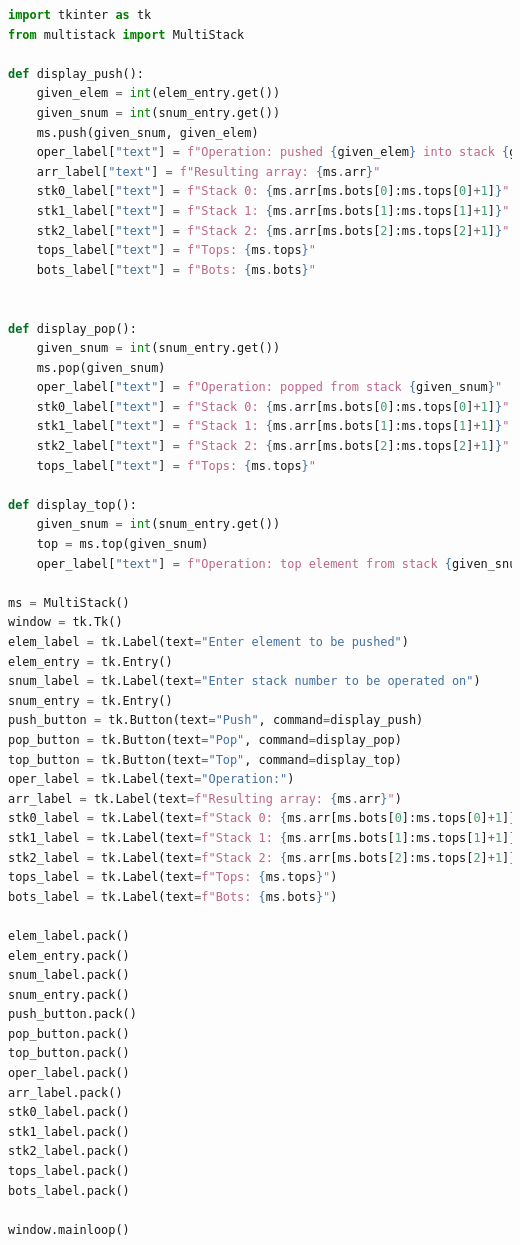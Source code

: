 \documentclass[12pt]{report}
\begin{document}
\begin{lstlisting}[language=Python, caption=multistack\_gui.py]
import tkinter as tk
from multistack import MultiStack

def display_push():
    given_elem = int(elem_entry.get())
    given_snum = int(snum_entry.get())
    ms.push(given_snum, given_elem)
    oper_label["text"] = f"Operation: pushed {given_elem} into stack {given_snum}"
    arr_label["text"] = f"Resulting array: {ms.arr}"
    stk0_label["text"] = f"Stack 0: {ms.arr[ms.bots[0]:ms.tops[0]+1]}"
    stk1_label["text"] = f"Stack 1: {ms.arr[ms.bots[1]:ms.tops[1]+1]}"
    stk2_label["text"] = f"Stack 2: {ms.arr[ms.bots[2]:ms.tops[2]+1]}"
    tops_label["text"] = f"Tops: {ms.tops}"
    bots_label["text"] = f"Bots: {ms.bots}"


def display_pop():
    given_snum = int(snum_entry.get())
    ms.pop(given_snum)
    oper_label["text"] = f"Operation: popped from stack {given_snum}"
    stk0_label["text"] = f"Stack 0: {ms.arr[ms.bots[0]:ms.tops[0]+1]}"
    stk1_label["text"] = f"Stack 1: {ms.arr[ms.bots[1]:ms.tops[1]+1]}"
    stk2_label["text"] = f"Stack 2: {ms.arr[ms.bots[2]:ms.tops[2]+1]}"
    tops_label["text"] = f"Tops: {ms.tops}"

def display_top():
    given_snum = int(snum_entry.get())
    top = ms.top(given_snum)
    oper_label["text"] = f"Operation: top element from stack {given_snum} is {top}"

ms = MultiStack()
window = tk.Tk()
elem_label = tk.Label(text="Enter element to be pushed")
elem_entry = tk.Entry()
snum_label = tk.Label(text="Enter stack number to be operated on")
snum_entry = tk.Entry()
push_button = tk.Button(text="Push", command=display_push)
pop_button = tk.Button(text="Pop", command=display_pop)
top_button = tk.Button(text="Top", command=display_top)
oper_label = tk.Label(text="Operation:")
arr_label = tk.Label(text=f"Resulting array: {ms.arr}")
stk0_label = tk.Label(text=f"Stack 0: {ms.arr[ms.bots[0]:ms.tops[0]+1]}")
stk1_label = tk.Label(text=f"Stack 1: {ms.arr[ms.bots[1]:ms.tops[1]+1]}")
stk2_label = tk.Label(text=f"Stack 2: {ms.arr[ms.bots[2]:ms.tops[2]+1]}")
tops_label = tk.Label(text=f"Tops: {ms.tops}")
bots_label = tk.Label(text=f"Bots: {ms.bots}")

elem_label.pack()
elem_entry.pack()
snum_label.pack()
snum_entry.pack()
push_button.pack()
pop_button.pack()
top_button.pack()
oper_label.pack()
arr_label.pack()
stk0_label.pack()
stk1_label.pack()
stk2_label.pack()
tops_label.pack()
bots_label.pack()

window.mainloop()
\end{lstlisting}
\end{document}
